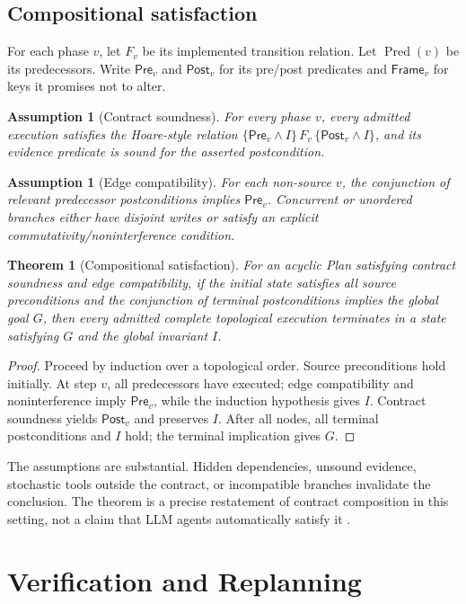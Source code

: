 \documentclass[11pt]{article}
\newtheorem{assumption}[definition]{Assumption}
\newtheorem{theorem}[definition]{Theorem}
\begin{document}
\subsection{Compositional satisfaction}
\label{sec:composition}
For each phase $v$, let $F_v$ be its implemented transition relation. Let $\operatorname{Pred}(v)$ be its predecessors. Write $\mathsf{Pre}_v$ and $\mathsf{Post}_v$ for its pre/post predicates and $\mathsf{Frame}_v$ for keys it promises not to alter.

\begin{assumption}[Contract soundness]
For every phase $v$, every admitted execution satisfies the Hoare-style relation
$\{\mathsf{Pre}_v\land I\}\,F_v\,\{\mathsf{Post}_v\land I\}$, and its evidence predicate is sound for the asserted postcondition.
\end{assumption}
\begin{assumption}[Edge compatibility]
For each non-source $v$, the conjunction of relevant predecessor postconditions implies $\mathsf{Pre}_v$. Concurrent or unordered branches either have disjoint writes or satisfy an explicit commutativity/noninterference condition.
\end{assumption}
\begin{theorem}[Compositional satisfaction]
\label{thm:composition}
For an acyclic Plan satisfying contract soundness and edge compatibility, if the initial state satisfies all source preconditions and the conjunction of terminal postconditions implies the global goal $G$, then every admitted complete topological execution terminates in a state satisfying $G$ and the global invariant $I$.
\end{theorem}
\begin{proof}
Proceed by induction over a topological order. Source preconditions hold initially. At step $v$, all predecessors have executed; edge compatibility and noninterference imply $\mathsf{Pre}_v$, while the induction hypothesis gives $I$. Contract soundness yields $\mathsf{Post}_v$ and preserves $I$. After all nodes, all terminal postconditions and $I$ hold; the terminal implication gives $G$.
\end{proof}
The assumptions are substantial. Hidden dependencies, unsound evidence, stochastic tools outside the contract, or incompatible branches invalidate the conclusion. The theorem is a precise restatement of contract composition in this setting, not a claim that LLM agents automatically satisfy it \citep{hoare1969axiomatic}.

\section{Verification and Replanning}
\end{document}
